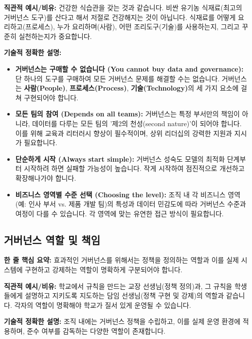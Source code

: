 \documentclass[11pt,a4paper]{article}
\theoremstyle{definition}
\begin{document}
\textbf{직관적 예시/비유:}
건강한 식습관을 갖는 것과 같습니다. 비싼 유기농 식재료(최고의 거버넌스 도구)를 산다고 해서 저절로 건강해지는 것이 아닙니다. 식재료를 어떻게 요리하고(프로세스), 누가 요리하며(사람), 어떤 조리도구(기술)를 사용하는지, 그리고 꾸준히 실천하는지가 중요합니다.

\textbf{기술적 정확한 설명:}
\begin{itemize}
    \item \textbf{거버넌스는 구매할 수 없습니다 (You cannot buy data and governance):}
    단 하나의 도구를 구매하여 모든 거버넌스 문제를 해결할 수는 없습니다. 거버넌스는 \textbf{사람(People)}, \textbf{프로세스(Process)}, \textbf{기술(Technology)}의 세 가지 요소에 걸쳐 구현되어야 합니다.
    \item \textbf{모든 팀의 참여 (Depends on all teams):}
    거버넌스는 특정 부서만의 책임이 아니라, 데이터를 다루는 모든 팀의 '제2의 천성(second nature)'이 되어야 합니다. 이를 위해 교육과 리터러시 향상이 필수적이며, 상위 리더십의 강력한 지원과 지시가 필요합니다.
    \item \textbf{단순하게 시작 (Always start simple):}
    거버넌스 성숙도 모델의 최적화 단계부터 시작하려 하면 실패할 가능성이 높습니다. 작게 시작하여 점진적으로 개선하고 확장해나가야 합니다.
    \item \textbf{비즈니스 영역별 수준 선택 (Choosing the level):}
    조직 내 각 비즈니스 영역(예: 인사 부서 vs. 제품 개발 팀)의 특성과 데이터 민감도에 따라 거버넌스 수준과 여정이 다를 수 있습니다. 각 영역에 맞는 유연한 접근 방식이 필요합니다.
\end{itemize}

\newpage
\subsection*{거버넌스 역할 및 책임}

\begin{keyconceptbox}
\textbf{한 줄 핵심 요약:} 효과적인 거버넌스를 위해서는 정책을 정의하는 역할과 이를 실제 시스템에 구현하고 강제하는 역할이 명확하게 구분되어야 합니다.
\end{keyconceptbox}

\textbf{직관적 예시/비유:}
학교에서 규칙을 만드는 교장 선생님(정책 정의)과, 그 규칙을 학생들에게 설명하고 지키도록 지도하는 담임 선생님(정책 구현 및 강제)의 역할과 같습니다. 각자의 역할이 명확해야 학교가 질서 있게 운영될 수 있습니다.

\textbf{기술적 정확한 설명:}
조직 내에는 거버넌스 정책을 수립하고, 이를 실제 운영 환경에 적용하며, 준수 여부를 감독하는 다양한 역할이 존재합니다.
\end{document}
